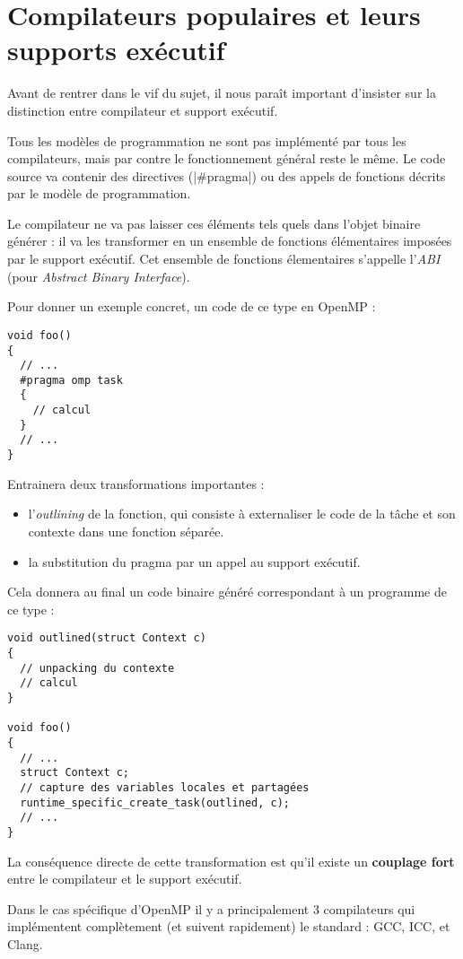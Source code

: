 \section{Compilateurs populaires et leurs supports exécutif}\label{sec:rw:compilers}


Avant de rentrer dans le vif du sujet, il nous paraît important d'insister sur la distinction entre compilateur et support exécutif.

Tous les modèles de programmation ne sont pas implémenté par tous les compilateurs, mais par contre le fonctionnement général reste le même.
Le code source va contenir des directives (|#pragma|) ou des appels de fonctions décrits par le modèle de programmation.

Le compilateur ne va pas laisser ces éléments tels quels dans l'objet binaire générer : il va les transformer en un ensemble de fonctions élémentaires imposées par le support exécutif. Cet ensemble de fonctions élementaires s'appelle l'\emph{ABI} (pour \emph{Abstract Binary Interface}).

Pour donner un exemple concret, un code de ce type en OpenMP :
\begin{lstlisting}
void foo()
{
  // ...
  #pragma omp task
  {
    // calcul
  }
  // ...
}
\end{lstlisting}

Entrainera deux transformations importantes :
\begin{itemize}
  \item l'\emph{outlining} de la fonction, qui consiste à externaliser le code de la tâche et son contexte dans une fonction séparée.
  \item la substitution du pragma par un appel au support exécutif.
\end{itemize}

Cela donnera au final un code binaire généré correspondant à un programme de ce type :

\begin{lstlisting}
void outlined(struct Context c)
{
  // unpacking du contexte
  // calcul
}

void foo()
{
  // ...
  struct Context c;
  // capture des variables locales et partagées
  runtime_specific_create_task(outlined, c);
  // ...
}
\end{lstlisting}

La conséquence directe de cette transformation est qu'il existe un \textbf{couplage fort} entre le compilateur et le support exécutif.

Dans le cas spécifique d'OpenMP il y a principalement 3 compilateurs qui implémentent complètement (et suivent rapidement) le standard : GCC, ICC, et Clang.


